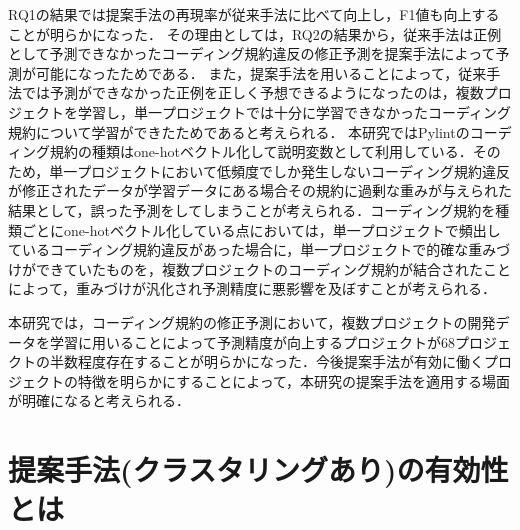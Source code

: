 \documentclass[11pt,dvipdfmx]{jreport}
\begin{document}
RQ1の結果では提案手法の再現率が従来手法に比べて向上し，F1値も向上することが明らかになった．
その理由としては，RQ2の結果から，従来手法は正例として予測できなかったコーディング規約違反の修正予測を提案手法によって予測が可能になったためである．
また，提案手法を用いることによって，従来手法では予測ができなかった正例を正しく予想できるようになったのは，複数プロジェクトを学習し，単一プロジェクトでは十分に学習できなかったコーディング規約について学習ができたためであると考えられる．
本研究ではPylintのコーディング規約の種類はone-hotベクトル化して説明変数として利用している．そのため，単一プロジェクトにおいて低頻度でしか発生しないコーディング規約違反が修正されたデータが学習データにある場合その規約に過剰な重みが与えられた結果として，誤った予測をしてしまうことが考えられる．コーディング規約を種類ごとにone-hotベクトル化している点においては，単一プロジェクトで頻出しているコーディング規約違反があった場合に，単一プロジェクトで的確な重みづけができていたものを，複数プロジェクトのコーディング規約が結合されたことによって，重みづけが汎化され予測精度に悪影響を及ぼすことが考えられる．

本研究では，コーディング規約の修正予測において，複数プロジェクトの開発データを学習に用いることによって予測精度が向上するプロジェクトが68プロジェクトの半数程度存在することが明らかになった．今後提案手法が有効に働くプロジェクトの特徴を明らかにすることによって，本研究の提案手法を適用する場面が明確になると考えられる．

\section{提案手法(クラスタリングあり)の有効性とは}

\begin{table}[th]
    \centering
    \caption{クラスタごとの予測結果の分析}
    \label{tab:cluster}
    \vspace{3mm}
\end{table}
\end{document}
